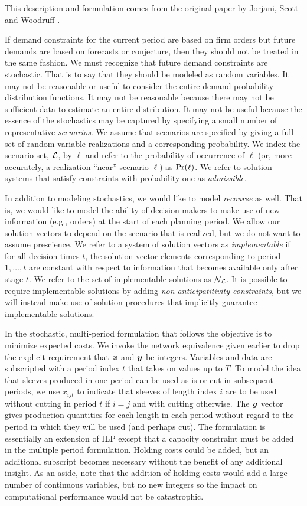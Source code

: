 This description and formulation comes from the original paper by Jorjani, Scott and Woodruff \cite{sizes}.

If demand constraints for the current period are
based on firm orders but future demands are based on forecasts or
conjecture, then they should not be treated in the same fashion. We
must recognize that future demand constraints are stochastic. That is
to say that they should be modeled as random variables.
It may not be reasonable or useful to consider the entire demand probability 
distribution functions. It may not be reasonable because there may not be 
sufficient data to estimate an entire distribution. It may not be useful
because the essence of the stochastics may be captured by specifying a 
small number of representative {\em scenarios}. We assume that scenarios 
are specified by giving a full set of random variable realizations and a 
corresponding probability. 
We index the scenario set, ${\cal L}$, by $\ell$ and 
refer to the probability of occurrence of $\ell$ (or, more accurately, a 
realization ``near'' scenario $\ell$) as $\mbox{Pr}(\ell)$.
We refer to solution systems that satisfy constraints with probability one as 
{\em admissible}. 

In addition to modeling stochastics, we would like to model {\em
recourse} as well. That is, we would like to model the ability of
decision makers to make use of new information (e.g., orders) at the
start of each planning period.  We allow our solution vectors to
depend on the scenario that is realized, but we do not want to assume
prescience. We refer to a system of solution vectors as {\em
implementable} if for all decision times $t$, the solution vector
elements corresponding to period $1,\ldots,t$ are constant with
respect to information that becomes available only after stage $t$. 
We refer to the set of implementable solutions as ${\cal N}_{\cal L}$.  It is
possible to require implementable solutions by adding {\em
non-anticipatitivity constraints}, but we will instead make use of
solution procedures that implicitly guarantee implementable solutions.

In the stochastic, multi-period formulation that follows the objective
is to minimize expected costs.  We invoke the network equivalence
given earlier to drop the explicit requirement that $\mbox{{\boldmath $x$}}$ and
$\mbox{{\boldmath $y$}}$ be integers. Variables and data are subscripted with a
period index $t$ that takes on values up to $T$. To model the idea
that sleeves produced in one period can be used as-is or cut in
subsequent periods, we use $x_{ijt}$ to indicate that sleeves of
length index $i$ are to be used without cutting in period $t$ if $i=j$
and with cutting otherwise.  The $\mbox{{\boldmath $y$}}$ vector gives production
quantities for each length in each period without regard to the period
in which they will be used (and perhaps cut). The formulation is
essentially an extension of ILP except that a capacity constraint
must be added in the multiple period formulation. Holding costs could
be added, but an additional subscript becomes necessary without the
benefit of any additional insight. As an aside, note that the addition
of holding costs would add a large number of continuous variables, but
no new integers so the impact on computational performance would not
be catastrophic.

